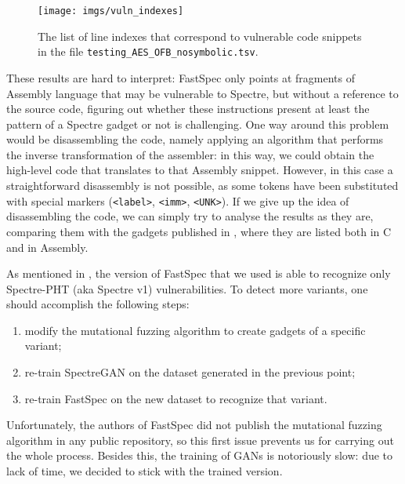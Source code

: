 \documentclass[target=mst,aauheader=aics]{thud}
\theoremstyle{definition}
\begin{document}
	\begin{figure}
		\centering
		\texttt{[image: imgs/vuln\_indexes]}
		\caption{The list of line indexes that correspond to vulnerable code snippets in the file \texttt{testing\_AES\_OFB\_nosymbolic.tsv}.}
		\label{fig:idx}
	\end{figure}

	These results are hard to interpret: FastSpec only points at fragments of Assembly language that may be vulnerable to Spectre, but without a reference to the source code, figuring out whether these instructions present at least the pattern of a Spectre gadget or not is challenging. One way around this problem would be disassembling the code, namely applying an algorithm that performs the inverse transformation of the assembler: in this way, we could obtain the high-level code that translates to that Assembly snippet. However, in this case a straightforward disassembly is not possible, as some tokens have been substituted with special markers (\texttt{<label>}, \texttt{<imm>}, \texttt{<UNK>}). If we give up the idea of disassembling the code, we can simply try to analyse the results as they are, comparing them with the gadgets published in \cite{Kocher2018}, where they are listed both in C and in Assembly.
	
	As mentioned in \cite{Tol2021}, the version of FastSpec that we used is able to recognize only Spectre-PHT (aka Spectre v1) vulnerabilities. To detect more variants, one should accomplish the following steps:
	\begin{enumerate}
		\item modify the mutational fuzzing algorithm to create gadgets of a specific variant;
		\item re-train SpectreGAN on the dataset generated in the previous point;
		\item re-train FastSpec on the new dataset to recognize that variant.
	\end{enumerate}
	Unfortunately, the authors of FastSpec did not publish the mutational fuzzing algorithm in any public repository, so this first issue prevents us for carrying out the whole process. Besides this, the training of GANs is notoriously slow: due to lack of time, we decided to stick with the trained version. 
		
\end{document}

